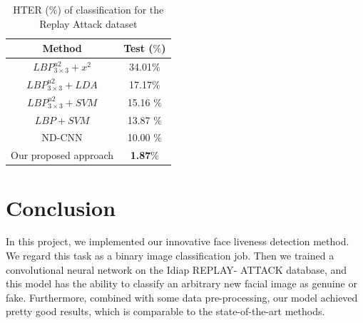 \documentclass[journal]{IEEEtran}
\begin{document}
 \begin{table}[ht]
 	\renewcommand{\arraystretch}{1.3}
 	\normalsize
 	\centering
 	\caption{ HTER ($\%$) of classification for the Replay Attack dataset}
 	\label{tab_EX_2}
 	\begin{tabular}{|c|c|}
 		\hline
 		Method & Test ($\%$)\\
 		\hline \hline
 		$LBP^{u2}_{3 \times3}+x^{2}$ & 34.01$\%$ \\
 		\hline
 		$LBP^{u2}_{3 \times3}+LDA$ & 17.17$\%$ \\
 		\hline 
 		$LBP^{u2}_{3 \times3}+SVM$ & 15.16 $\%$  \\
 		\hline
 		$LBP+SVM$ & 13.87 $\%$ \\
 		\hline
 		ND-CNN  & 10.00 $\%$ \\
 		\hline
 		Our proposed approach  & \textbf{1.87$\%$} \\
 		\hline
 	\end{tabular}
 \end{table}


\section{Conclusion}

In this project, we implemented our innovative face liveness detection method. We regard this task as a binary image classification job. Then we trained a convolutional neural network on the Idiap REPLAY- ATTACK database, and this model has the ability to classify an arbitrary new facial image as genuine or fake. Furthermore, combined with some data pre-processing, our model achieved pretty good results, which is comparable to the state-of-the-art methods.



%
\end{document}
